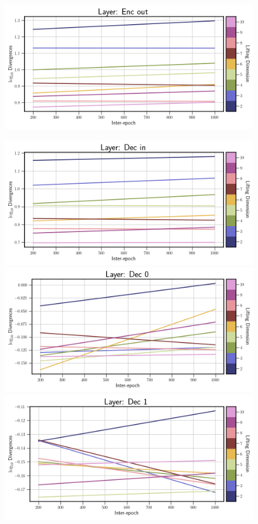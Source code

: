 \begin{figure}[!htbp]
\begin{minipage}{.5\textwidth}
        \includegraphics[width=\textwidth]{"../Figures/duffing_div_plot_linear_enc_out.png"} 
    \end{minipage}%
    \begin{minipage}{.5\textwidth}
        \includegraphics[width=\textwidth]{"../Figures/duffing_div_plot_linear_dec_in.png"} 
        \includegraphics[width=\textwidth]{"../Figures/duffing_div_plot_linear_dec_0.png"} 
        \includegraphics[width=\textwidth]{"../Figures/duffing_div_plot_linear_dec_1.png"} 

\end{minipage}
\end{figure}
